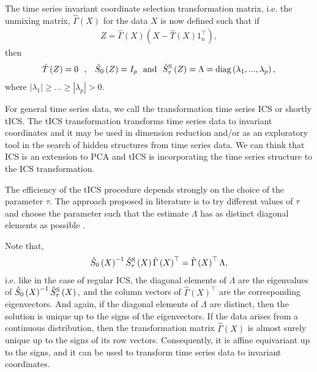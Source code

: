 \documentclass{llncs}
\begin{document}
 The time series invariant coordinate selection transformation matrix, i.e. the unmixing matrix, $\hat{\Gamma}\left(X\right)$ for the data $X$ is now defined such that if 
\begin{align*}
Z= \hat{\Gamma}\left(X\right)\left(X-\hat{T}\left(X\right)1_n^\top\right),
\end{align*}
then
\begin{eqnarray*}
\hat{T}\left(Z\right)=0\text{ } \text{ , } \text{ }  \  \hat{S}_0\left(Z\right)=I_p  \text{ } \text{ and } \text{ }  \hat{S}^\textnormal{S}_{\tau}\left(Z\right)=\Lambda=\text{diag}\left(\lambda_1, ..., \lambda_p\right),
\end{eqnarray*}
where $|\lambda_1|\ge ...\ge |\lambda_p|>0$.



For general time series data, we call the transformation time series ICS or shortly tICS. The tICS transformation transforms time series data to invariant coordinates and it may be used in dimension reduction and/or as an exploratory tool in the search of hidden structures from time series data. We can think that ICS is an extension to PCA and tICS is incorporating the time series structure to the ICS transformation.

The efficiency of the tICS procedure depends strongly on the choice of the parameter $\tau$. The approach proposed in literature is to try different values of $\tau$ and  choose the parameter such that the estimate $\Lambda$ has as distinct diagonal elements as possible  \cite{amari2002}.


Note that,
\begin{align*}
\hat{S}_0\left(X\right)^{-1}\hat{S}_{\tau}^\textnormal{S}\left(X\right) \hat{\Gamma}\left(X\right)^\top =\hat{\Gamma}\left(X\right)^\top\Lambda,
\end{align*}
i.e. like in the case of regular ICS, the diagonal elements of $\Lambda$ are the eigenvalues of $\hat{S}_0\left(X\right)^{-1}\hat{S}^\textnormal{S}_{\tau}\left(X\right),$ and the column vectors of $\hat{\Gamma}\left(X\right)^\top$ are the corresponding eigenvectors. And again, if the diagonal elements of $\Lambda$ are distinct, then the solution is unique up to the signs of the eigenvectors.
If the data arises from a continuous distribution, then the transformation matrix $\hat{\Gamma}\left(X\right)$ is almost surely unique up to the signs of its row vectors. Consequently, it is affine equivariant up to the signs, and it can be used to transform time series data to invariant coordinates.
\end{document}
